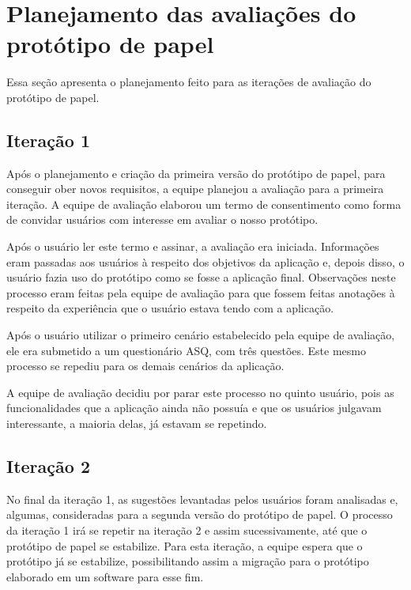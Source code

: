     \pagebreak
    \section{Planejamento das avaliações do protótipo de papel}
      
      Essa seção apresenta o planejamento feito para as iterações de avaliação do protótipo de papel.
      
      \subsection{Iteração 1}
	
	Após o planejamento e criação da primeira versão do protótipo de papel, para conseguir ober novos requisitos, 
	a equipe planejou a avaliação para a primeira iteração. A equipe de avaliação elaborou um termo de consentimento como forma de convidar usuários
	com interesse em avaliar o nosso protótipo.
	
	Após o usuário ler este termo e assinar, a avaliação era iniciada. Informações eram passadas aos usuários à respeito dos objetivos
	da aplicação e, depois disso, o usuário fazia uso do protótipo como se fosse a aplicação final. Observações neste processo eram feitas 
	pela equipe de avaliação para que fossem feitas anotações à respeito da experiência que o usuário estava tendo com a aplicação.
	
	Após o usuário utilizar o primeiro cenário estabelecido pela equipe de avaliação, ele era submetido a um questionário ASQ, com três questões.
	Este mesmo processo se repediu para os demais cenários da aplicação.
	
	A equipe de avaliação decidiu por parar este processo no quinto usuário, pois as funcionalidades que a aplicação ainda não possuía e que os 
	usuários julgavam interessante, a maioria delas, já estavam se repetindo.
	
      \subsection{Iteração 2}
	
	No final da iteração 1, as sugestões levantadas pelos usuários foram analisadas e, algumas, consideradas para a segunda versão do protótipo de papel.
	O processo da iteração 1 irá se repetir na iteração 2 e assim sucessivamente, até que o protótipo de papel se estabilize. Para esta iteração, a equipe 
	espera que o protótipo já se estabilize, possibilitando assim a migração para o protótipo elaborado em um software para esse fim.
      
	